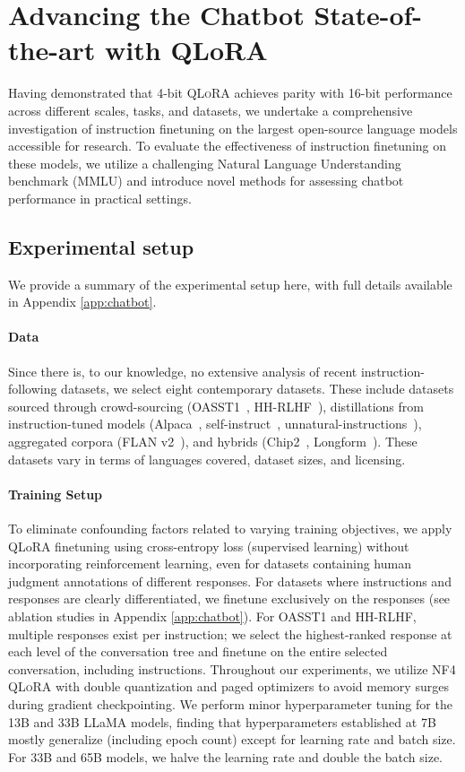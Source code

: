 \section{Advancing the Chatbot State-of-the-art with QLoRA}
\label{sec:pushing}
Having demonstrated that 4-bit \textsc{QLoRA} achieves parity with 16-bit performance across different scales, tasks, and datasets, we undertake a comprehensive investigation of instruction finetuning on the largest open-source language models accessible for research. To evaluate the effectiveness of instruction finetuning on these models, we utilize a challenging Natural Language Understanding benchmark (MMLU) and introduce novel methods for assessing chatbot performance in practical settings.

\subsection{Experimental setup} We provide a summary of the experimental setup here, with full details available in Appendix \ref{app:chatbot}. 

\paragraph{Data} Since there is, to our knowledge, no extensive analysis of recent instruction-following datasets, we select eight contemporary datasets. These include datasets sourced through crowd-sourcing (OASST1~\citep{kopf2023openassistant}, HH-RLHF~\citep{bai2022training}), distillations from instruction-tuned models (Alpaca~\citep{alpaca}, self-instruct~\citep{wang2022self}, unnatural-instructions~\citep{honovich2022unnatural}), aggregated corpora (FLAN v2~\citep{chung2022scaling}), and hybrids (Chip2~\citep{laion2023}, Longform~\citep{koksal2023longform}). These datasets vary in terms of languages covered, dataset sizes, and licensing.

\paragraph{Training Setup} To eliminate confounding factors related to varying training objectives, we apply QLoRA finetuning using cross-entropy loss (supervised learning) without incorporating reinforcement learning, even for datasets containing human judgment annotations of different responses. For datasets where instructions and responses are clearly differentiated, we finetune exclusively on the responses (see ablation studies in Appendix \ref{app:chatbot}). For OASST1 and HH-RLHF, multiple responses exist per instruction; we select the highest-ranked response at each level of the conversation tree and finetune on the entire selected conversation, including instructions. Throughout our experiments, we utilize NF4 \textsc{QLoRA} with double quantization and paged optimizers to avoid memory surges during gradient checkpointing. We perform minor hyperparameter tuning for the 13B and 33B LLaMA models, finding that hyperparameters established at 7B mostly generalize (including epoch count) except for learning rate and batch size. For 33B and 65B models, we halve the learning rate and double the batch size.

